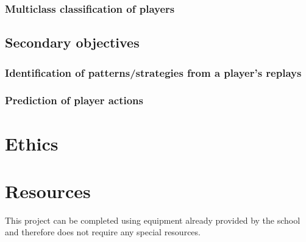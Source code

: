 \documentclass{sty/SizheArticle}
\begin{document}
\subsubsection{Multiclass classification of players}

\subsection{Secondary objectives}

\subsubsection{Identification of patterns/strategies from a player's replays}

\subsubsection{Prediction of player actions}




\section{Ethics}


\section{Resources}
This project can be completed using equipment already provided by the school and therefore does not require any special resources.
\end{document}
